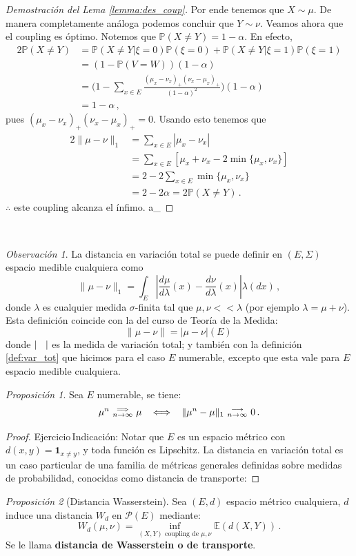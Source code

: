 \documentclass[letterpaper,11pt]{article} %
\def\espacio{\hspace{.25cm}\,}
\theoremstyle{defbreak}
\theoremstyle{propbreak}
\theoremstyle{remark}
\newtheorem{remark}{Observación}[subsection]
\theoremstyle{break}
\newtheorem{proposition}{Proposición}[subsection]
\def\E{\mathbb{E}}
\def\P{\mathbb{P}}
\def\conv{\mbox{ }\substack{\longrightarrow \\ n\to\infty}\mbox{ }}
\def\convdebil{\mbox{ }\substack{\Longrightarrow \\n \to \infty}\mbox{ }}
\def\ejercicio{\color{blue}Ejercicio\color{black}}
\def\gris{\color{mygray}}
\def\negro{\color{black}}
\def\findem{\null\hfill\color{white}a\color{black}_\square}
\begin{document}
\begin{proof}[Demostración del Lema \ref{lemma:des_coup}]
Por ende tenemos que $X\sim\mu$. De manera completamente análoga podemos concluir que $Y\sim\nu$.
Veamos ahora que el coupling es óptimo. Notemos que $\P(X\neq Y)=1-\alpha$. En efecto,
\begin{alignat*}{2}
    \P(X\neq Y) & = \P(X\neq Y|\xi=0)\P(\xi=0)+\P(X\neq Y|\xi=1)\P(\xi=1) \\
     & = (1-\P(V=W))(1-\alpha) \\
     & = \bigg(1-\displaystyle\sum_{x\in E}\frac{(\mu_x-\nu_x)_+(\nu_x-\mu_x)_+}{(1-\alpha)^2}\bigg)(1-\alpha) \\
     & = 1-\alpha \, ,
\end{alignat*}
pues $(\mu_x-\nu_x)_+(\nu_x-\mu_x)_+ = 0$. Usando esto tenemos que
\begin{alignat*}{2}
    \|\mu-\nu\|_1 & = \displaystyle \sum_{x\in E}|\mu_x-\nu_x| \\
     & = \displaystyle \sum_{x\in E}[\mu_x+\nu_x-2\min\{\mu_x,\nu_x\}] \\
     & = \displaystyle 2-2\sum_{x\in E}\min\{\mu_x,\nu_x\} \\
     & = 2-2\alpha = 2\P(X\neq Y) \, .
\end{alignat*}
$\therefore$ este coupling alcanza el ínfimo. \findem
\negro 
\end{proof}

\vspace{.5cm} \\
\begin{remark}
La distancia en variación total se puede definir en $(E,\Sigma)$ espacio medible cualquiera como
$$ \|\mu-\nu\|_1 = \displaystyle \int_E|\frac{d\mu}{d\lambda}(x)-\frac{d\nu}{d\lambda}(x)|\lambda(dx)\, ,$$
donde $\lambda$ es cualquier medida $\sigma$-finita tal que $\mu,\nu<<\lambda$ (por ejemplo $\lambda=\mu+\nu$).
\\ Esta definición coincide con la del curso de Teoría de la Medida:
$$ \|\mu-\nu\|=|\mu-\nu|(E) \, $$
donde $|\espacio|$ es la medida de variación total; y también con la definición \ref{def:var_tot} que hicimos para el caso $E$ numerable, excepto que esta vale para $E$ espacio medible cualquiera.
\end{remark}
\begin{proposition}%
Sea $E$ numerable, se tiene:
$$ \mu^n\convdebil\mu \espacio \Longleftrightarrow \espacio \|\mu^n-\mu\|_1\conv0\,.$$
\end{proposition}
\begin{proof}
\ejercicio \espacio \gris Indicación: Notar que $E$ es un espacio métrico con $d(x,y)=\mathbf{1}_{x\neq y}$, y toda función es Lipschitz.  La distancia en variación total es un caso particular de una familia de m\'etricas generales definidas sobre medidas de probabilidad, conocidas como distancia de transporte: 
\negro
\end{proof}
\begin{proposition}[Distancia Wasserstein]  %
Sea $(E,d)$ espacio métrico cualquiera, $d$ induce una distancia $W_d$ en $\mathcal{P}(E)$ mediante:
$$ W_d(\mu,\nu) = \displaystyle \inf_{(X,Y)\text{ coupling de }\mu,\nu}\E(d(X,Y)) \, .$$
Se le llama \textbf{distancia de Wasserstein o de transporte}.
\end{proposition}
\end{document}
